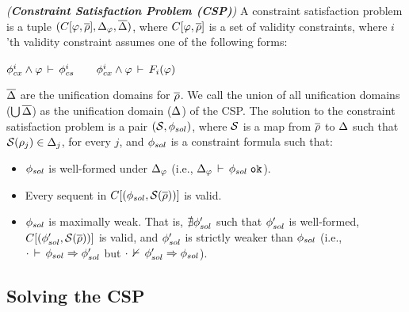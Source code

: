\begin{definition}
\emph{(\textbf{Constraint Satisfaction Problem (CSP)})} A constraint
satisfaction problem is a tuple $(C\lbrack \varphi,\overline{\rho} \rbrack,\Delta_{\varphi}, \overline{\Delta})$, where $C\lbrack
\varphi,\overline{\rho} \rbrack$ is a set of validity constraints, where
$i$'th validity constraint assumes one of the following forms:
\begin{center}
\(
    \phi_{cx}^{i} \wedge \varphi\,\vdash\,\phi_{cs}^{i}\qquad
    \phi_{cx}^{i} \wedge \varphi\,\vdash\,F_i(\varphi)
\)
\end{center}
$\overline{\Delta}$ are the unification domains for $\overline{\rho}$. We call the
union of all unification domains ($\bigcup\overline{\Delta}$) as the
unification domain ($\Delta$) of the CSP.  The solution to the
constraint satisfaction problem is a pair $(\mathcal{S},\phi_{sol})$, where
$\mathcal{S}$ is a map from $\overline{\rho}$ to $\Delta$ such that
$\mathcal{S}(\rho_j) \in \Delta_j$, for every $j$, and $\phi_{sol}$ is a
constraint formula such that:
\begin{itemize}
\item $\phi_{sol}$ is well-formed under $\Delta_{\varphi}$ (i.e.,
$\Delta_{\varphi}\,\vdash\,\phi_{sol} \; \texttt{ok}$).
\item Every sequent in $C\lbrack (\phi_{sol},\mathcal{S}(\overline{\rho})) \rbrack$
is valid.
\item $\phi_{sol}$ is maximally weak. That is, $\nexists \phi_{sol}'$ such
that $\phi_{sol}'$ is well-formed, $C\lbrack (\phi_{sol}',\mathcal{S}(\overline{\rho}))
\rbrack$ is valid, and $\phi_{sol}'$ is strictly weaker than $\phi_{sol}$
(i.e., $\cdot\,\vdash\,\phi_{sol} \Rightarrow \phi_{sol}'$ but
$\cdot\,\nvdash\,\phi_{sol}' \Rightarrow \phi_{sol}$).
\end{itemize}
\end{definition}


\subsection{Solving the CSP}

